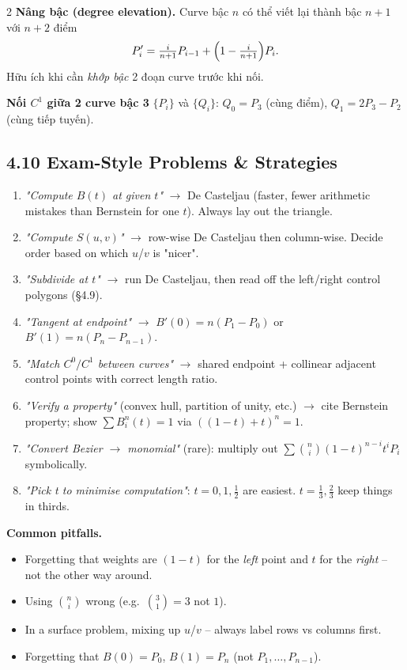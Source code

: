 \begin{paracol}{2}
\textbf{Nâng bậc (degree elevation).} Curve bậc $n$ có thể viết lại thành bậc $n{+}1$ với $n{+}2$ điểm
\[
P_i'=\tfrac{i}{n+1}P_{i-1}+\Bigl(1-\tfrac{i}{n+1}\Bigr)P_i.
\]
Hữu ích khi cần \emph{khớp bậc} 2 đoạn curve trước khi nối.

\textbf{Nối $C^1$ giữa 2 curve bậc 3} $\{P_i\}$ và $\{Q_i\}$:
$Q_0=P_3$ (cùng điểm), $Q_1=2P_3-P_2$ (cùng tiếp tuyến).

\switchcolumn*

\subsection*{4.10 Exam-Style Problems \& Strategies}

\begin{enumerate}[leftmargin=*,nosep]
  \item \emph{"Compute $B(t)$ at given $t$"} $\to$ De Casteljau (faster, fewer arithmetic mistakes than Bernstein for one $t$). Always lay out the triangle.
  \item \emph{"Compute $S(u,v)$"} $\to$ row-wise De Casteljau then column-wise. Decide order based on which $u$/$v$ is "nicer".
  \item \emph{"Subdivide at $t$"} $\to$ run De Casteljau, then read off the left/right control polygons (\S 4.9).
  \item \emph{"Tangent at endpoint"} $\to$ $B'(0)=n(P_1-P_0)$ or $B'(1)=n(P_n-P_{n-1})$.
  \item \emph{"Match $C^0/C^1$ between curves"} $\to$ shared endpoint + collinear adjacent control points with correct length ratio.
  \item \emph{"Verify a property"} (convex hull, partition of unity, etc.) $\to$ cite Bernstein property; show $\sum B_i^{n}(t)=1$ via $((1-t)+t)^n=1$.
  \item \emph{"Convert Bezier $\to$ monomial"} (rare): multiply out $\sum\binom{n}{i}(1-t)^{n-i}t^i P_i$ symbolically.
  \item \emph{"Pick t to minimise computation"}: $t=0,1,\tfrac12$ are easiest. $t=\tfrac13,\tfrac23$ keep things in thirds.
\end{enumerate}

\textbf{Common pitfalls.}
\begin{itemize}[leftmargin=*,nosep]
  \item Forgetting that weights are $(1-t)$ for the \emph{left} point and $t$ for the \emph{right} -- not the other way around.
  \item Using $\binom{n}{i}$ wrong (e.g.\ $\binom{3}{1}=3$ not $1$).
  \item In a surface problem, mixing up $u$/$v$ -- always label rows vs columns first.
  \item Forgetting that $B(0)=P_0$, $B(1)=P_n$ (not $P_1,\dots,P_{n-1}$).
\end{itemize}


\end{paracol}
